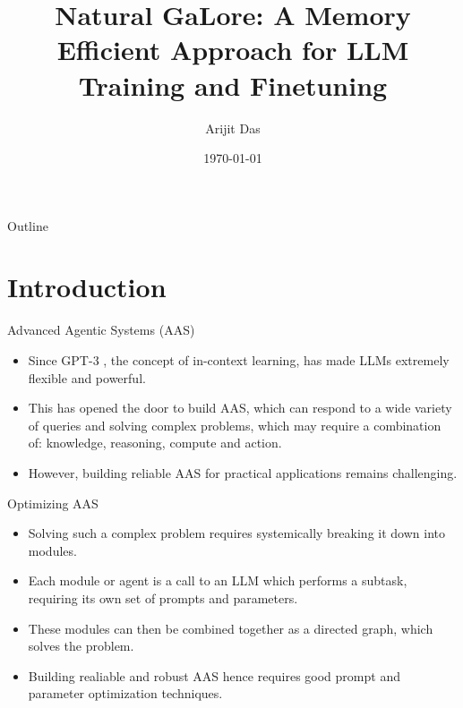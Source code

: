 \documentclass{beamer}
\title[Natural GaLore]{Natural GaLore: A Memory Efficient Approach for LLM Training and Finetuning}
\author{Arijit Das}
\date{\today}
\begin{document}
\begin{frame}
    \titlepage
\end{frame}

\begin{frame}{Outline}
    \tableofcontents
\end{frame}

\section{Introduction}

\begin{frame}{Advanced Agentic Systems (AAS)}
    \begin{itemize}
        \item Since GPT-3 \citep{brownLanguageModelsAre2020}, the concept of in-context learning, has made LLMs extremely flexible and powerful.
        \item This has opened the door to build AAS, which can respond to a wide variety of queries and solving complex problems, which may require a combination of: knowledge, reasoning, compute and action.
        \item However, building reliable AAS for practical applications remains challenging.
    \end{itemize}
\end{frame}

\begin{frame}{Optimizing AAS}
    \begin{itemize}
        \item Solving such a complex problem requires systemically breaking it down into modules.
        \item Each module or agent is a call to an LLM which performs a subtask, requiring its own set of prompts and parameters.
        \item These modules can then be combined together as a directed graph, which solves the problem.
        \item Building realiable and robust AAS hence requires good prompt and parameter optimization techniques.
    \end{itemize}
\end{frame}
\end{document}
